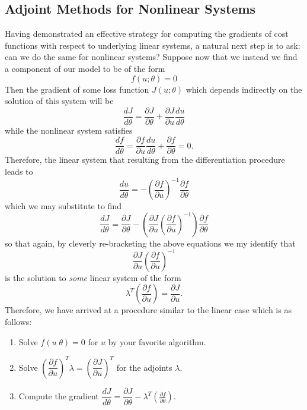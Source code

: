 \subsection{Adjoint Methods for Nonlinear Systems}
Having demonstrated an effective strategy for computing the gradients of cost functions with respect to underlying linear systems, a natural next step is to ask: can we do the same for nonlinear systems? Suppose now that we instead we find a component of our model to be of the form
\begin{equation}
  f(u;\theta) = 0
\end{equation}
Then the gradient of some loss function $J(u;\theta)$ which depends indirectly on the solution of this system will be
\begin{equation}
  \frac{dJ}{d\theta} = \frac{\partial J}{\partial \theta} + \frac{\partial J}{\partial u}\frac{du}{d\theta}
\end{equation}
while the nonlinear system satisfies
\begin{equation}
  \frac{df}{d\theta} = \frac{\partial f}{\partial u}\frac{du}{d\theta} + \frac{\partial f}{\partial \theta} = 0.
\end{equation}
Therefore, the linear system that resulting from the differentiation procedure leads to
\begin{equation}
  \frac{du}{d\theta} = -\left(\frac{\partial f}{\partial u}\right)^{-1} \frac{\partial f}{\partial \theta}
\end{equation}
which we may substitute to find
\begin{equation}
  \frac{dJ}{d\theta} = \frac{\partial J}{\partial \theta} - \left(\frac{\partial J}{\partial u}\left(\frac{\partial f}{\partial u}\right)^{-1} \right)\frac{\partial f}{\partial \theta}
\end{equation}
so that again, by cleverly re-bracketing the above equations we my identify that
\begin{equation*}
  \frac{\partial J}{\partial u}\left(\frac{\partial f}{\partial u}\right)^{-1}
\end{equation*}
is the solution to \textit{some} linear system of the form
\begin{equation}
  \lambda^T\left(\frac{\partial f}{\partial u}\right) = \frac{\partial J}{\partial u}.
\end{equation}
Therefore, we have arrived at a procedure similar to the linear case which is as follows:
\begin{enumerate}
\item Solve $f(u\;\theta)=0$ for $u$ by your favorite algorithm.
\item Solve $\left(\dfrac{\partial f}{\partial u} \right)^T\lambda = \left( \dfrac{\partial J}{\partial u}\right)^T$ for the adjoints $\lambda$.
\item Compute the gradient $\dfrac{dJ}{d\theta} = \dfrac{\partial J}{\partial \theta} - \lambda^T\left(\frac{\partial f}{\partial \theta}\right)$. 
\end{enumerate}


